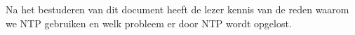 Na het bestuderen van dit document heeft de lezer kennis van de reden waarom we NTP gebruiken en welk probleem er door NTP wordt opgelost.


